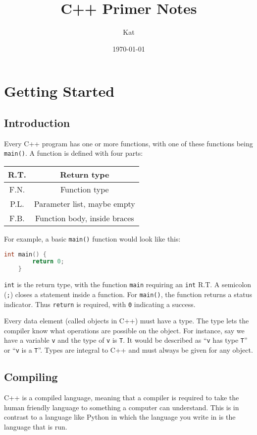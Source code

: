 \documentclass[12pt, a4paper]{report}
\title{C++ Primer Notes}
\author{Kat}
\date{\today}
\begin{document}
\maketitle
\tableofcontents
\newpage
\chapter{Getting Started}
\section{Introduction}
Every C++ program has one or more functions, with one of these functions being \verb|main()|. A function is defined with four parts:
\begin{center}
	\begin{tabular}{ |c|c| }
		\hline
		R.T. & Return type \\
		\hline
		F.N. & Function type \\
		\hline
		P.L. & Parameter list, maybe empty \\
		\hline
		F.B. & Function body, inside braces \\
		\hline
	\end{tabular}
\end{center}
For example, a basic \verb|main()| function would look like this:
\begin{center}
\begin{lstlisting}[language=C++]
	int main() { 
		return 0;
	}
\end{lstlisting}
\end{center}
\verb|int| is the return type, with the function \verb|main| requiring an \verb|int| R.T. A semicolon (\verb|;|) closes a statement inside a function. For \verb|main()|, the function returns a status indicator. Thus \verb|return| is required, with \verb|0| indicating a success.

Every data element (called objects in C++) must have a type. The type lets the compiler know what operations are possible on the object. 
For instance, say we have a variable \verb|v| and the type of \verb|v| is \verb|T|. It would be described as ``\verb|v| has type \verb|T|''
or ``\verb|v| is a \verb|T|''. Types are integral to C++ and must always be given for any object.
\section{Compiling}
C++ is a compiled language, meaning that a compiler is required to take the human friendly language to something a computer can understand.
This is in contrast to a language like Python in which the language you write in is the language that is run.
\end{document}
